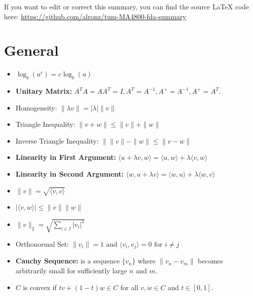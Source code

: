 \documentclass{article}
\begin{document}
\newpage
If you want to edit or correct this summary, you can find the source LaTeX code here: \href{https://github.com/alronz/tum-MA4800-fda-summary}{https://github.com/alronz/tum-MA4800-fda-summary}







\newpage


\section{General}

\begin{itemize}

\item 

$ \log_b (a^c) = c \log_b (a) $

\item \textbf{Unitary Matrix:} \( A^T A = AA^T = I, A^T = A^{-1}, A^{+} = A^{-1}, A^{+} = A^T \).
\item Homogeneity: $\|\lambda v\| = |\lambda|\|v\|$
\item Triangle Inequality: $\|v + w\| \leq \|v\| + \|w\|$

\item Inverse Triangle Inequality: $\| \|v\| - \|w\| \leq \|v - w\|$

\item \textbf{Linearity in First Argument:} $\langle u + \lambda v, w \rangle = \langle u, w \rangle + \lambda \langle v, w \rangle$
\item \textbf{Linearity in Second Argument:} $\langle w, u + \lambda v \rangle = \langle w, u \rangle + \lambda \langle w, v \rangle$

\item $\|v\| = \sqrt{\langle v, v \rangle}$

\item $|\langle v, w \rangle| \leq \|v\| \|w\|$

 \item 
    $ \|v\|_2 = \sqrt{\sum_{i \in I} |v_i|^2} $

\item Orthonormal Set: $\|v_i\| = 1 \text{ and } \langle v_i, v_j \rangle = 0 \text{ for } i \neq j$

\item \textbf{Cauchy Sequence:} is a sequence $\{v_n\}$ where $\|v_n - v_m\|$ becomes arbitrarily small for sufficiently large $n$ and $m$.

\item $C$ is convex if $tv + (1 - t)w \in C$ for all $v, w \in C$ and $t \in [0, 1]$.


\end{itemize}
\end{document}
